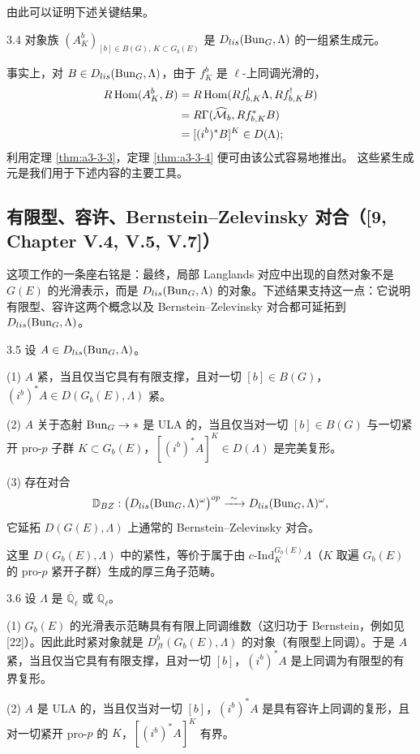 由此可以证明下述关键结果。
\begin{thm}{3.4}
对象族 $(A^b_K)_{[b]\in B(G),\,K\subset G_b(E)}$ 是 $D_{lis}(\operatorname{Bun}_G,\Lambda)$ 的一组紧生成元。\label{thm:a3-3-4}
\end{thm}

事实上，对 $B\in D_{lis}(\operatorname{Bun}_G,\Lambda)$，由于 $f^b_K$ 是 $\ell$-上同调光滑的，
\begin{align*}
R\operatorname{Hom}(A^b_K,B)&=R\operatorname{Hom}(Rf^!_{b,K}\Lambda,Rf^!_{b,K}B)\\
&=R\Gamma(\widehat{\mathcal M}_b,Rf^*_{b,K}B)\\
&=[(i^b)^*B]^K\in D(\Lambda);
\end{align*}
利用定理 \ref{thm:a3-3-3}，定理 \ref{thm:a3-3-4} 便可由该公式容易地推出。
这些紧生成元是我们用于下述内容的主要工具。

\subsection{有限型、容许、Bernstein--Zelevinsky 对合（[9, Chapter V.4, V.5, V.7]）}

这项工作的一条座右铭是：最终，局部 Langlands 对应中出现的自然对象不是 $G(E)$ 的光滑表示，而是 $D_{lis}(\operatorname{Bun}_G,\Lambda)$ 的对象。下述结果支持这一点：它说明有限型、容许这两个概念以及 Bernstein--Zelevinsky 对合都可延拓到 $D_{lis}(\operatorname{Bun}_G,\Lambda)$。
\begin{thm}{3.5}
设 $A\in D_{lis}(\operatorname{Bun}_G,\Lambda)$。

(1) $A$ 紧，当且仅当它具有有限支撑，且对一切 $[b]\in B(G)$，$(i^b)^*A\in D(G_b(E),\Lambda)$ 紧。

(2) $A$ 关于态射 $\operatorname{Bun}_G\to*$ 是 ULA 的，当且仅当对一切 $[b]\in B(G)$ 与一切紧开 pro-$p$ 子群 $K\subset G_b(E)$，$[(i^b)^*A]^K\in D(\Lambda)$ 是完美复形。

(3) 存在对合
\[
\mathbb D_{BZ}:\big(D_{lis}(\Bun_G,\Lambda)^\omega\big)^{op}\xrightarrow{\ \sim\ }D_{lis}(\Bun_G,\Lambda)^\omega,
\]
它延拓 $D(G(E),\Lambda)$ 上通常的 Bernstein--Zelevinsky 对合。\label{thm:a3-3-5}
\end{thm}

这里 $D(G_b(E),\Lambda)$ 中的紧性，等价于属于由 $c\text{-Ind}_K^{G_b(E)}\Lambda$（$K$ 取遍 $G_b(E)$ 的 pro-$p$ 紧开子群）生成的厚三角子范畴。
\begin{rem}{3.6}
设 $\Lambda$ 是 $\overline{\mathbb Q}_\ell$ 或 $\mathbb Q_\ell$。

(1) $G_b(E)$ 的光滑表示范畴具有有限上同调维数（这归功于 Bernstein，例如见 [22]）。因此此时紧对象就是 $D^b_{ft}(G_b(E),\Lambda)$ 的对象（有限型上同调）。于是 $A$ 紧，当且仅当它具有有限支撑，且对一切 $[b]$，$(i^b)^*A$ 是上同调为有限型的有界复形。

(2) $A$ 是 ULA 的，当且仅当对一切 $[b]$，$(i^b)^*A$ 是具有容许上同调的复形，且对一切紧开 pro-$p$ 的 $K$，$[(i^b)^*A]^K$ 有界。\label{rem:a3-3-6}
\end{rem}

